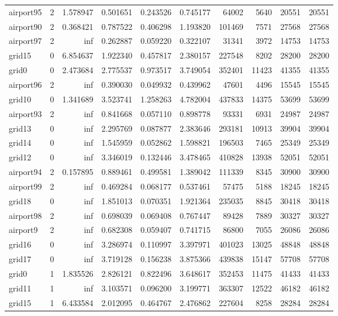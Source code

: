 \begin{longtable}{|l|r|r|r|r|r|r|r|r|r|}
airport95 & 2 & 1.578947 & 0.501651 & 0.243526 & 0.745177 & 64002 & 5640 & 20551 & 20551 \\
airport90 & 2 & 0.368421 & 0.787522 & 0.406298 & 1.193820 & 101469 & 7571 & 27568 & 27568 \\
airport97 & 2 & inf & 0.262887 & 0.059220 & 0.322107 & 31341 & 3972 & 14753 & 14753 \\
grid15 & 0 & 6.854637 & 1.922340 & 0.457817 & 2.380157 & 227548 & 8202 & 28200 & 28200 \\
grid0 & 0 & 2.473684 & 2.775537 & 0.973517 & 3.749054 & 352401 & 11423 & 41355 & 41355 \\
airport96 & 2 & inf & 0.390030 & 0.049932 & 0.439962 & 47601 & 4496 & 15545 & 15545 \\
grid10 & 0 & 1.341689 & 3.523741 & 1.258263 & 4.782004 & 437833 & 14375 & 53699 & 53699 \\
airport93 & 2 & inf & 0.841668 & 0.057110 & 0.898778 & 93331 & 6931 & 24987 & 24987 \\
grid13 & 0 & inf & 2.295769 & 0.087877 & 2.383646 & 293181 & 10913 & 39904 & 39904 \\
grid14 & 0 & inf & 1.545959 & 0.052862 & 1.598821 & 196503 & 7465 & 25349 & 25349 \\
grid12 & 0 & inf & 3.346019 & 0.132446 & 3.478465 & 410828 & 13938 & 52051 & 52051 \\
airport94 & 2 & 0.157895 & 0.889461 & 0.499581 & 1.389042 & 111339 & 8345 & 30900 & 30900 \\
airport99 & 2 & inf & 0.469284 & 0.068177 & 0.537461 & 57475 & 5188 & 18245 & 18245 \\
grid18 & 0 & inf & 1.851013 & 0.070351 & 1.921364 & 235035 & 8845 & 30418 & 30418 \\
airport98 & 2 & inf & 0.698039 & 0.069408 & 0.767447 & 89428 & 7889 & 30327 & 30327 \\
airport9 & 2 & inf & 0.682308 & 0.059407 & 0.741715 & 86800 & 7055 & 26086 & 26086 \\
grid16 & 0 & inf & 3.286974 & 0.110997 & 3.397971 & 401023 & 13025 & 48848 & 48848 \\
grid17 & 0 & inf & 3.719128 & 0.156238 & 3.875366 & 439838 & 15147 & 57708 & 57708 \\
grid0 & 1 & 1.835526 & 2.826121 & 0.822496 & 3.648617 & 352453 & 11475 & 41433 & 41433 \\
grid11 & 1 & inf & 3.103571 & 0.096200 & 3.199771 & 363307 & 12522 & 46182 & 46182 \\
grid15 & 1 & 6.433584 & 2.012095 & 0.464767 & 2.476862 & 227604 & 8258 & 28284 & 28284 \\

\end{longtable}
